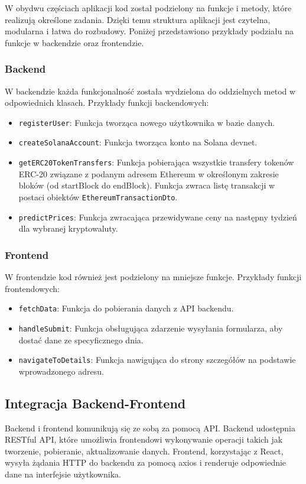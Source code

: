 W obydwu częściach aplikacji kod został podzielony na funkcje i metody, które realizują określone zadania. Dzięki temu struktura aplikacji jest czytelna, modularna i łatwa do rozbudowy. Poniżej przedstawiono przykłady podziału na funkcje w backendzie oraz frontendzie.

\subsubsection{Backend}
W backendzie każda funkcjonalność została wydzielona do oddzielnych metod w odpowiednich klasach. Przykłady funkcji backendowych:
\begin{itemize}
    \item \texttt{registerUser}: Funkcja tworząca nowego użytkownika w bazie danych.
    \item \texttt{createSolanaAccount}: Funkcja tworząca konto na Solana devnet.
    \item \texttt{getERC20TokenTransfers}: Funkcja pobierająca wszystkie transfery tokenów ERC-20 związane z podanym adresem Ethereum w określonym zakresie bloków (od startBlock do endBlock). Funkcja zwraca listę transakcji w postaci obiektów \texttt{EthereumTransactionDto}.
		\item \texttt{predictPrices}: Funkcja zwracająca przewidywane ceny na następny tydzień dla wybranej kryptowaluty.
\end{itemize}

\subsubsection{Frontend}
W frontendzie kod również jest podzielony na mniejsze funkcje. Przykłady funkcji frontendowych:
\begin{itemize}
    \item \texttt{fetchData}: Funkcja do pobierania danych z API backendu.
    \item \texttt{handleSubmit}: Funkcja obsługująca zdarzenie wysyłania formularza, aby dostać dane ze specyficznego dnia.
    \item \texttt{navigateToDetails}: Funkcja nawigująca do strony szczegółów na podstawie wprowadzonego adresu.
\end{itemize}

\subsection{Integracja Backend-Frontend}

Backend i frontend komunikują się ze sobą za pomocą API. Backend udostępnia RESTful API, które umożliwia frontendowi wykonywanie operacji takich jak tworzenie, pobieranie, aktualizowanie danych. Frontend, korzystając z React, wysyła żądania HTTP do backendu za pomocą axios i renderuje odpowiednie dane na interfejsie użytkownika.

